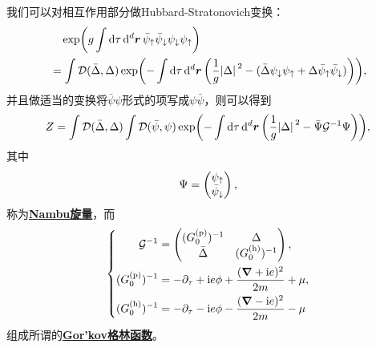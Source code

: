 \documentclass[hyperref, UTF8, a4paper]{ctexart}
\newcommand*{\ii}{\mathrm{i}}
\newcommand*{\fd}[1]{\mathcal{D}{#1}}
\newcommand{\concept}[1]{\underline{\textbf{#1}}}
\begin{document}
我们可以对相互作用部分做Hubbard-Stratonovich变换：
\[
    \begin{aligned}
        &\quad \exp(g \int \dd{\tau} \dd[d]{\vb*{r}} \bar{\psi}_\uparrow \bar{\psi}_\downarrow \psi_\downarrow \psi_\uparrow) \\
        &= \int \fd{(\bar{\Delta}, \Delta)} \exp(- \int \dd{\tau} \dd[d]{\vb*{r}} \left( \frac{1}{g} \abs*{\Delta}^2 - (\bar{\Delta} \psi_\downarrow \psi_\uparrow + \Delta \bar{\psi}_\uparrow \bar{\psi}_\downarrow) \right) ),
    \end{aligned}
\]
并且做适当的变换将$\bar{\psi} \psi$形式的项写成$\psi \bar{\psi}$，则可以得到
\begin{equation}
    Z = \int \fd{(\bar{\Delta}, \Delta)} \int \fd{(\bar{\psi}, \psi)} \exp( - \int \dd{\tau} \dd[d]{\vb*{r}} \left( \frac{1}{g} \abs*{\Delta}^2 - \bar{\Psi} \mathcal{G}^{-1} \Psi \right) ),
\end{equation}
其中
\begin{equation}
    \Psi = \pmqty{\psi_\uparrow \\ \bar{\psi}_\downarrow},
\end{equation}
称为\concept{Nambu旋量}，而
\begin{equation}
    \left\{
        \begin{aligned}
            \mathcal{G}^{-1} &= \pmqty{(G^\text{(p)}_0)^{-1} & \Delta \\ \bar{\Delta} & (G^\text{(h)}_0)^{-1}}, \\
            (G^\text{(p)}_0)^{-1} &= - \partial_\tau + \ii e \phi + \frac{(\grad + \ii e)^2}{2m} + \mu, \\
            (G^\text{(h)}_0)^{-1} &= - \partial_\tau - \ii e \phi - \frac{(\grad - \ii e)^2}{2m} - \mu
        \end{aligned}
    \right.
\end{equation}
组成所谓的\concept{Gor'kov格林函数}。
\end{document}
